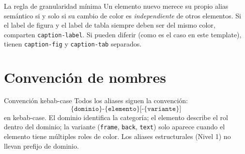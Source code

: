 \begin{observacion}{La regla de granularidad mínima}
Un elemento nuevo merece su propio alias semántico si y solo si su
cambio de color es \textit{independiente} de otros elementos. Si el
label de figura y el label de tabla siempre deben ser del mismo color,
comparten \texttt{caption-label}. Si pueden diferir (como es el caso en
este template), tienen \texttt{caption-fig} y \texttt{caption-tab}
separados.
\end{observacion}

\section{Convención de nombres}
\label{ap:sec:nombres}

\begin{definicion}{Convención kebab-case}
\label{ap:def:kebab}
Todos los aliases siguen la convención:
\[
  \texttt{\{dominio\}-\{elemento\}[-\{variante\}]}
\]
en kebab-case. El dominio identifica la categoría; el elemento describe
el rol dentro del dominio; la variante (\texttt{frame}, \texttt{back},
\texttt{text}) solo aparece cuando el elemento tiene múltiples roles de
color. Los aliases estructurales (Nivel 1) no llevan prefijo de dominio.
\end{definicion}

